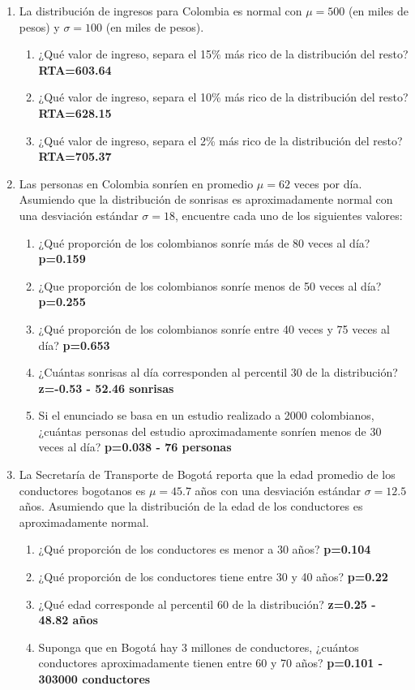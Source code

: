 \documentclass[letterpaper]{article}
\begin{document}
\begin{enumerate}
	\item La distribución de ingresos para Colombia es normal con $\mu=500$ (en miles de pesos) y $\sigma=100$ (en miles de pesos).
	\begin{enumerate}
		\item ¿Qué valor de ingreso, separa el 15\% más rico de la distribución del resto? {\bf RTA=603.64}
		\item ¿Qué valor de ingreso, separa el 10\% más rico de la distribución del resto? {\bf RTA=628.15}
		\item ¿Qué valor de ingreso, separa el 2\% más rico de la distribución del resto? {\bf RTA=705.37}
	\end{enumerate}

\item Las personas en Colombia sonríen en promedio $\mu=62$ veces por día. Asumiendo que la distribución de sonrisas es aproximadamente normal con una desviación estándar $\sigma=18$, encuentre cada uno de los siguientes valores:
\begin{enumerate}
	\item ¿Qué proporción de los colombianos sonríe más de 80 veces al día? {\bf p=0.159}
	\item ¿Que proporción de los colombianos sonríe menos de 50 veces al día? {\bf p=0.255}
	\item ¿Qué proporción de los colombianos sonríe entre 40 veces y 75 veces al día? {\bf p=0.653}
	\item ¿Cuántas sonrisas al día corresponden al percentil 30 de la distribución? {\bf z=-0.53 - 52.46 sonrisas}
	\item Si el enunciado se basa en un estudio realizado a 2000 colombianos, ¿cuántas personas del estudio aproximadamente sonríen menos de 30 veces al día? {\bf p=0.038 - 76 personas}
\end{enumerate}
\item La Secretaría de Transporte de Bogotá reporta que la edad promedio de los conductores bogotanos es $\mu=45.7$ años con una desviación estándar $\sigma=12.5$ años. Asumiendo que la distribución de la edad de los conductores es aproximadamente normal.
\begin{enumerate}
	\item ¿Qué proporción de los conductores es menor a 30 años? {\bf p=0.104}
	\item ¿Qué proporción de los conductores tiene entre 30 y 40 años? {\bf p=0.22}
	\item ¿Qué edad corresponde al percentil 60 de la distribución? {\bf z=0.25 - 48.82 años}
	\item Suponga que en Bogotá hay 3 millones de conductores, ¿cuántos conductores aproximadamente tienen entre 60 y 70 años? {\bf p=0.101 - 303000 conductores}
\end{enumerate}


\end{enumerate}
\end{document}

